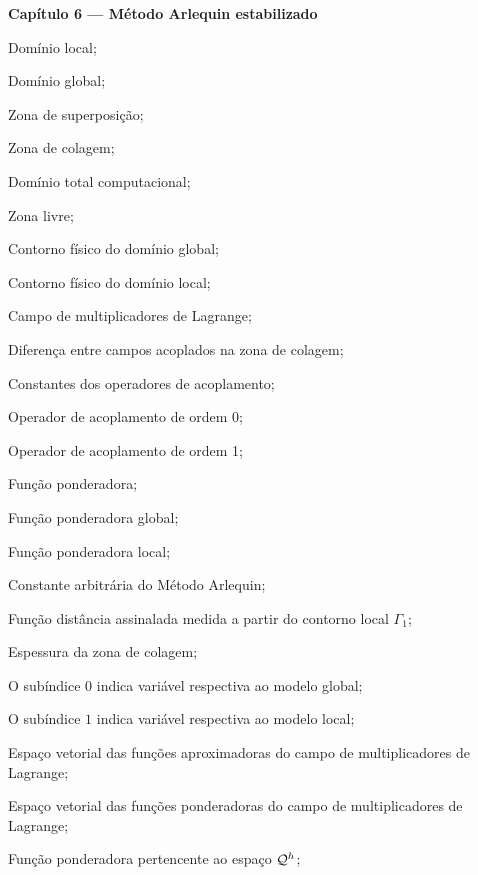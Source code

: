 \begin{simbolos}
   \vspace{0.5cm}
   \item[]\textbf{Capítulo 6 — Método Arlequin estabilizado}
   \item[$\Omega_1$] Domínio local;
   \item[$\Omega_0$] Domínio global;
   \item[$\overlappingZone$] Zona de superposição;
   \item[$\gluingZone$] Zona de colagem;
   \item[$\Omega$] Domínio total computacional;
   \item[$\freeZone$] Zona livre;
   \item[$\Gamma_0$] Contorno físico do domínio global;
   \item[$\Gamma_1$] Contorno físico do domínio local;
   \item[$\lagrangeMultiplier$] Campo de multiplicadores de Lagrange;
   \item[$\Delta\velocity$] Diferença entre campos acoplados na zona de colagem;
   \item[$k_{0},k_{1}$] Constantes dos operadores de acoplamento;
   \item[$L^{2}$] Operador de acoplamento de ordem 0;
   \item[$H^{1}$] Operador de acoplamento de ordem 1;
   \item[$\arlequinWF$] Função ponderadora;
   \item[$\arlequinWFGlobal$] Função ponderadora global;
   \item[$\arlequinWFLocal$] Função ponderadora local;
   \item[$k_{a}$] Constante arbitrária do Método Arlequin;
   \item[$Y_{1}$] Função distância assinalada medida a partir do contorno local $\Gamma_1$;
   \item[$\delta_s$] Espessura da zona de colagem;
   \item[$(\bullet)_{0}$] O subíndice $0$ indica variável respectiva ao modelo global;
   \item[$(\bullet)_{1}$] O subíndice $1$ indica variável respectiva ao modelo local;
   \item[$\lagSolution$] Espaço vetorial das funções aproximadoras do campo de multiplicadores de Lagrange;
   \item[$\lagTest$] Espaço vetorial das funções ponderadoras do campo de multiplicadores de Lagrange;
   \item[$\lagrangeMultiplierWFh$] Função ponderadora pertencente ao espaço $\lagTest$;

\end{simbolos}
